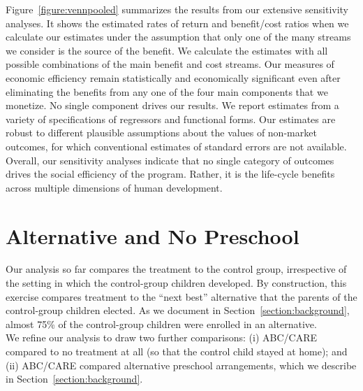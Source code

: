 \noindent Figure~\ref{figure:vennpooled} summarizes the results from our extensive sensitivity analyses. It shows the estimated rates of return and benefit/cost ratios when we calculate our estimates under the assumption that only one of the many streams we consider is the source of the benefit. We calculate the estimates with all possible combinations of the main benefit and cost streams. Our measures of economic efficiency remain statistically and economically significant even after eliminating the benefits from any one of the four main components that we monetize. No single component drives our results. We report estimates from a variety of specifications of regressors and functional forms. Our estimates are robust to different plausible assumptions about the values of non-market outcomes, for which conventional estimates of standard errors are not available. Overall, our sensitivity analyses indicate that no single category of outcomes drives the social efficiency of the program. Rather, it is the life-cycle benefits across multiple dimensions of human development.

\section{Alternative and No Preschool} \label{section:cbaresultscont}

Our analysis so far compares the treatment to the control group, irrespective of the setting in which the control-group children developed. By construction, this exercise compares treatment to the ``next best'' alternative that the parents of the control-group children elected. As we document in Section~\ref{section:background}, almost 75\% of the control-group children were enrolled in an alternative.\\

\noindent We refine our analysis to draw two further comparisons: (i) ABC/CARE compared to no treatment at all (so that the control child stayed at home); and (ii) ABC/CARE compared alternative preschool arrangements, which we describe in Section~\ref{section:background}.\\ 

